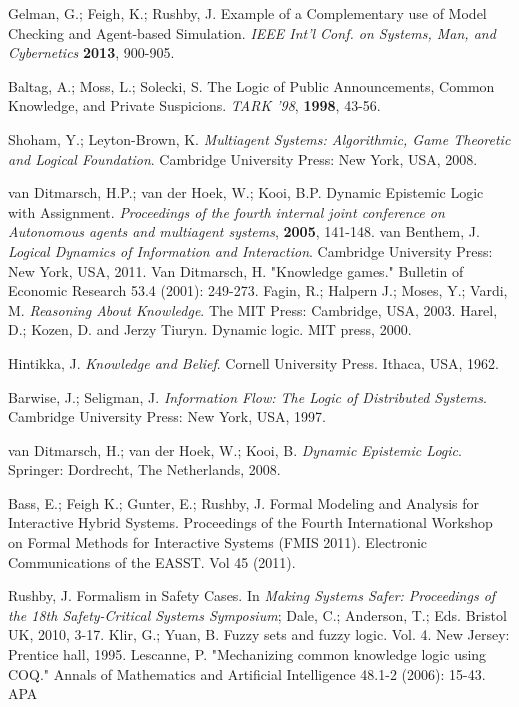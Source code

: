 \begin{thebibliography}{9}
	 	Gelman, G.; Feigh, K.; Rushby, J. Example of a Complementary use of Model Checking and Agent-based Simulation. {\em IEEE Int'l Conf. on Systems, Man, and Cybernetics} {\bf 2013}, 900-905.
	 	
	 	
	 	
	 	Baltag, A.; Moss, L.; Solecki, S. The Logic of Public Announcements, Common Knowledge, and Private Suspicions. {\em TARK '98}, {\bf 1998}, 43-56.
	 	
	 	Shoham, Y.; Leyton-Brown, K. {\em Multiagent Systems: Algorithmic, Game Theoretic and Logical Foundation}. Cambridge University Press: New York, USA, 2008.
	 	
	 	van Ditmarsch, H.P.; van der Hoek, W.; Kooi, B.P. Dynamic Epistemic Logic with Assignment. {\em Proceedings of the fourth internal joint conference on Autonomous agents and multiagent systems}, {\bf 2005}, 141-148.
	 	van Benthem, J. {\em Logical Dynamics of Information and Interaction}. Cambridge University Press: New York, USA, 2011.
	 	Van Ditmarsch, H. "Knowledge games." Bulletin of Economic Research 53.4 (2001): 249-273.
	 	Fagin, R.; Halpern J.; Moses, Y.; Vardi, M. {\em Reasoning About Knowledge}. The MIT Press: Cambridge, USA, 2003.
	 	Harel, D.; Kozen, D. and Jerzy Tiuryn. Dynamic logic. MIT press, 2000.
	 	
	 	Hintikka, J. {\em Knowledge and Belief}. Cornell University Press. Ithaca, USA, 1962.
	 	
	 	Barwise, J.; Seligman, J. {\em Information Flow: The Logic of Distributed Systems}. Cambridge University Press: New York, USA, 1997.
	 	
	 	van Ditmarsch, H.; van der Hoek, W.; Kooi, B. {\em Dynamic Epistemic Logic}. Springer: Dordrecht, The Netherlands, 2008.
	 	
	 	 Bass, E.; Feigh K.; Gunter, E.; Rushby, J. Formal Modeling and Analysis for Interactive Hybrid Systems. Proceedings of the Fourth International Workshop on Formal Methods for Interactive Systems (FMIS 2011). Electronic Communications of the EASST. Vol 45 (2011).
	 	
	 	Rushby, J. Formalism in Safety Cases. In {\em Making Systems Safer: Proceedings of the 18th Safety-Critical Systems Symposium}; Dale, C.; Anderson, T.; Eds. Bristol UK, 2010, 3-17.
	 	Klir, G.; Yuan, B. Fuzzy sets and fuzzy logic. Vol. 4. New Jersey: Prentice hall, 1995.
	 	Lescanne, P. "Mechanizing common knowledge logic using COQ." Annals of Mathematics and Artificial Intelligence 48.1-2 (2006): 15-43.
	 	APA	
	 	

\end{thebibliography}
